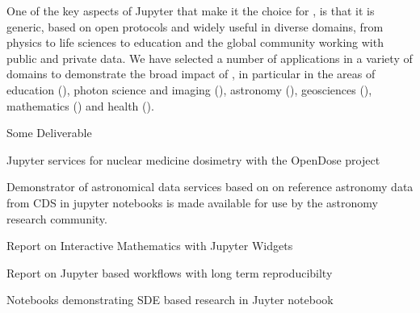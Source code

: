 \begin{workpackage}
\begin{wpdescription}
  One of the key aspects of Jupyter that make it the choice for
  \TheProject, is that it is generic, based on open protocols and
  widely useful in diverse domains, from physics to life sciences to
  education and the global community working with public and private
  data. We have selected a number of applications in a variety of domains
  to demonstrate the broad impact of \TheProject, in particular in the
  areas of education (), photon science and
  imaging (), astronomy
  (), geosciences (),
  mathematics () and health ().

\end{wpdescription}

\begin{tasklist}
% 







\end{tasklist}



\begin{wpdelivs}
\begin{wpdeliv}[due=1,miles=startup,id=infrastructure,dissem=PU,nature=DEC,lead=SRL]
  {Some Deliverable}
\end{wpdeliv}
\begin{wpdeliv}[due=1,miles=startup,id=opendose-analysis,dissem=PU,nature=DEM,lead=INSERM]
  {Jupyter services for nuclear medicine dosimetry with the OpenDose project}
\end{wpdeliv}
\begin{wpdeliv}[due=40,miles=final,id=application-astro,dissem=PU,nature=DEM,lead=CDS]
    {Demonstrator of astronomical data services based on on reference astronomy data from CDS in jupyter notebooks is made available for use by the astronomy research community.}
\end{wpdeliv}
\begin{wpdeliv}[due=36,miles=final,id=math,dissem=PU,nature=R,lead=UPSUD]
  {Report on Interactive Mathematics with Jupyter Widgets}
\end{wpdeliv}
\begin{wpdeliv}[due=48,miles=final,id=xfel-workflows,dissem=PU,nature=R,lead=XFEL]
  {Report on Jupyter based workflows with long term reproducibilty}
\end{wpdeliv}
\begin{wpdeliv}[due=48,miles=final,id=gpu-jupyter-notebooks,dissem=PU,nature=R,lead=SIL]
  {Notebooks demonstrating SDE based research in Juyter notebook}
\end{wpdeliv}

\end{wpdelivs}
\end{workpackage}

